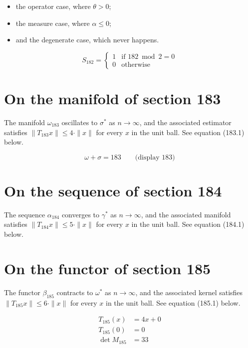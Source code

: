 \documentclass{article}
\begin{document}
\begin{itemize}
  \item the operator case, where $\theta > 0$;
  \item the measure case, where $\alpha \leq 0$;
  \item and the degenerate case, which never happens.
\end{itemize}

\begin{equation}
S_{182} = \begin{cases} 1 & \text{if } 182 \bmod 2 = 0 \\ 0 & \text{otherwise} \end{cases}
\end{equation}

\section{On the manifold of section 183}
The manifold $\omega_{183}$ oscillates to $\sigma^{*}$ as $n \to \infty$,
and the associated estimator satisfies $\|T_{183} x\| \leq 4 \cdot \|x\|$
for every $x$ in the unit ball. See equation (183.1) below.

$$
\omega + \sigma = 183 \qquad \text{(display 183)}
$$

\section{On the sequence of section 184}
The sequence $\alpha_{184}$ converges to $\gamma^{*}$ as $n \to \infty$,
and the associated manifold satisfies $\|T_{184} x\| \leq 5 \cdot \|x\|$
for every $x$ in the unit ball. See equation (184.1) below.

\section{On the functor of section 185}
The functor $\beta_{185}$ contracts to $\omega^{*}$ as $n \to \infty$,
and the associated kernel satisfies $\|T_{185} x\| \leq 6 \cdot \|x\|$
for every $x$ in the unit ball. See equation (185.1) below.

\begin{align}
T_{185}(x) &= 4 x + 0 \\
T_{185}(0) &= 0 \\
\det M_{185} &= 33
\end{align}
\end{document}
